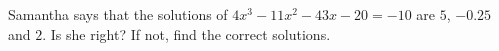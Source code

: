 Samantha says that the solutions of $4x^3-11x^2-43x-20=-10$ are $5$, $-0.25$ and $2$. Is she right? If not, find the correct solutions.
